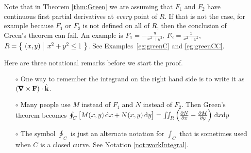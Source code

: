 \begin{warning}\label{warn:Green}
Note that in Theorem \ref{thm:Green} we are assuming that
$F_1$ and $F_2$ have continuous first partial derivatives 
at \emph{every} point of $R$.
If that is not the case, for example
because $F_1$ or $F_2$ is not defined on all of $R$, then 
the conclusion of Green's theorem can fail. An example is
$F_1=-\frac{y}{x^2+y^2}$, $F_2=\frac{x}{x^2+y^2}$, $R=\big\{ \ (x,y)\ \big|\ x^2+y^2\le 1\ \big\}$.
See Examples~\ref{eg:greenC} and \ref{eg:greenCC}.
\end{warning}

\noindent
Here are three notational remarks before we start the proof.
\begin{itemize}\itemsep1pt \parskip0pt  \itemindent-15pt
\item[$\circ$]
One way to remember the integrand on the right hand side is to write it
as $(\vnabla\times\vF)\cdot\hk$.
\item[$\circ$]
Many people use $M$ instead of $F_1$ and $N$ instead of $F_2$.
Then Green's theorem becomes 
$\oint_{C} \big[M(x,y)\,\dee{x} +N(x,y)\,\dee{y}\big]
 =\dblInt_{R}\Big(\frac{\partial N}{\partial x} 
                - \frac{\partial M}{\partial y}\Big)\ \dee{x}\dee{y}$
\item[$\circ$] The symbol $\oint_C$ is just an alternate notation for $\int_C$
that is sometimes used when $C$ is a closed curve. 
See Notation \ref{not:workIntegral}.
\end{itemize}
